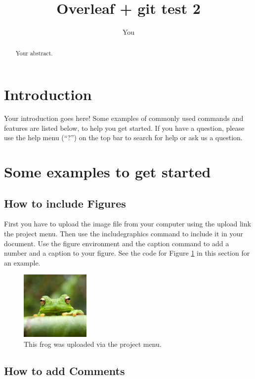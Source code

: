 \documentclass[a4paper]{article}
\title{Overleaf + git test 2}
\author{You}
\begin{document}
\maketitle

\begin{abstract}
Your abstract.
\end{abstract}

\section{Introduction}

Your introduction goes here! Some examples of commonly used commands and features are listed below, to help you get started. If you have a question, please use the help menu (``?'') on the top bar to search for help or ask us a question. 

\section{Some examples to get started}

\subsection{How to include Figures}

First you have to upload the image file from your computer using the upload link the project menu. Then use the includegraphics command to include it in your document. Use the figure environment and the caption command to add a number and a caption to your figure. See the code for Figure \ref{fig:frog} in this section for an example.

\begin{figure}
\centering
\includegraphics[width=0.3\textwidth]{frog.jpg}
\caption{\label{fig:frog}This frog was uploaded via the project menu.}
\end{figure}

\subsection{How to add Comments}
\end{document}
